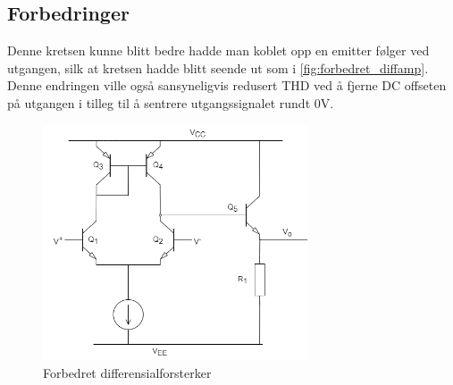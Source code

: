 \subsection{Forbedringer}
\label{forbedringer}
Denne kretsen kunne blitt bedre hadde man koblet opp en emitter følger ved utgangen, silk at kretsen hadde blitt seende ut som i \autoref{fig:forbedret_diffamp}. Denne endringen ville også sansyneligvis redusert THD ved å fjerne DC offseten på utgangen i tilleg til å sentrere utgangssignalet rundt 0V.

\begin{figure}[H]
    \centering
    \includegraphics[width=0.7\textwidth]{Bilder/diffamp_V2.drawio.png}
    \caption{Forbedret differensialforsterker}
    \label{fig:forbedret_diffamp}	
\end{figure}
